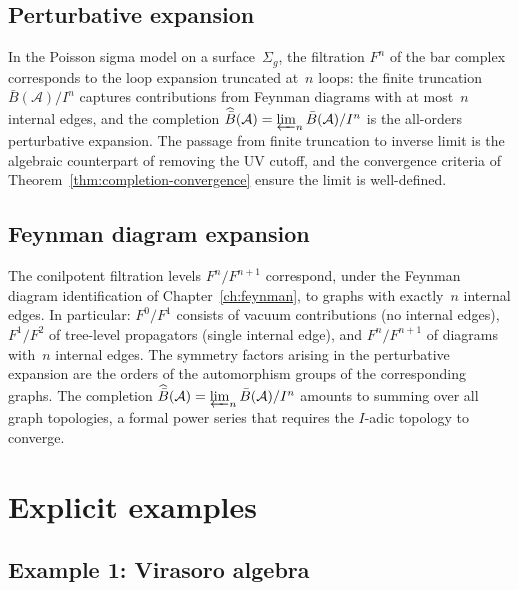\subsection{Perturbative expansion}

\begin{interpretation}\label{interp:completion-renorm}
In the Poisson sigma model on a surface~$\Sigma_g$, the filtration $F^n$ of the bar complex corresponds to the loop expansion truncated at~$n$ loops: the finite truncation $\bar{B}(\mathcal{A})/I^n$ captures contributions from Feynman diagrams with at most~$n$ internal edges, and the completion $\widehat{\bar{B}}(\mathcal{A}) = \varprojlim_n \bar{B}(\mathcal{A})/I^n$ is the all-orders perturbative expansion.  The passage from finite truncation to inverse limit is the algebraic counterpart of removing the UV cutoff, and the convergence criteria of Theorem~\ref{thm:completion-convergence} ensure the limit is well-defined.
\end{interpretation}

\subsection{Feynman diagram expansion}

\begin{remark}\label{rem:feynman-conilpotent}
The conilpotent filtration levels $F^n/F^{n+1}$ correspond, under the Feynman diagram identification of Chapter~\ref{ch:feynman}, to graphs with exactly~$n$ internal edges.  In particular: $F^0/F^1$ consists of vacuum contributions (no internal edges), $F^1/F^2$ of tree-level propagators (single internal edge), and $F^n/F^{n+1}$ of diagrams with~$n$ internal edges.  The symmetry factors arising in the perturbative expansion are the orders of the automorphism groups of the corresponding graphs.  The completion $\widehat{\bar{B}}(\mathcal{A}) = \varprojlim_n \bar{B}(\mathcal{A})/I^n$ amounts to summing over all graph topologies, a formal power series that requires the $I$-adic topology to converge.
\end{remark}

\section{Explicit examples}

\subsection{Example 1: Virasoro algebra}

